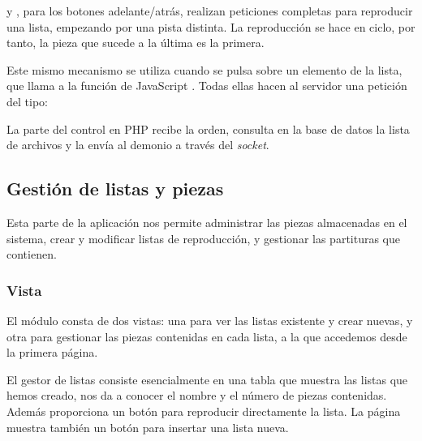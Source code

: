  y , para los botones adelante/atrás, realizan peticiones completas para reproducir una lista, empezando por una pista distinta. La reproducción se hace en ciclo, por tanto, la pieza que sucede a la última es la primera.

Este mismo mecanismo se utiliza cuando se pulsa sobre un elemento de la lista, que llama a la función de JavaScript . Todas ellas hacen al servidor una petición del tipo: 

\begin{center}
\end{center}

La parte del control en PHP recibe la orden, consulta en la base de datos la lista de archivos y la envía al demonio a través del \textit{socket}.

\subsection{Gestión de listas y piezas}
\label{subsec:impl_gestor}

Esta parte de la aplicación nos permite administrar las piezas almacenadas en el sistema, crear y modificar listas de reproducción, y gestionar las partituras que contienen.

\subsubsection{Vista}

El módulo consta de dos vistas: una para ver las listas existente y crear nuevas, y otra para gestionar las piezas contenidas en cada lista, a la que accedemos desde la primera página.

El gestor de listas consiste esencialmente en una tabla que muestra las listas que hemos creado, nos da a conocer el nombre y el número de piezas contenidas. Además proporciona un botón para reproducir directamente la lista. La página muestra también un botón para insertar una lista nueva.

\smallskip


